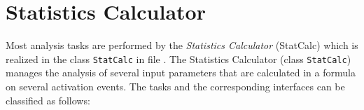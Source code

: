 
\section{Statistics Calculator}
\label{GAVStatisticsCalculator}

Most analysis tasks are performed by the {\em Statistics Calculator} (StatCalc) which is realized in the class \lstinline|StatCalc| in file . The Statistics Calculator (class \lstinline|StatCalc|) manages the analysis of several 
input parameters that are calculated in a formula on several activation events. 
The tasks and the corresponding interfaces can be classified as follows:


